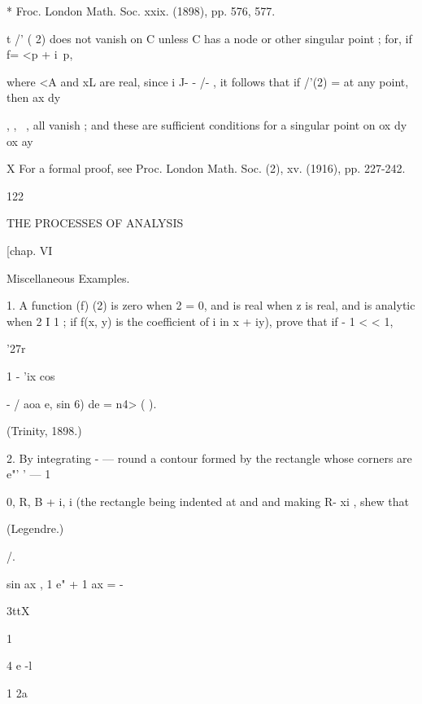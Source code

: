 {* Froc. London Math. Soc. xxix. (1898), pp. 576, 577.

t /' ( 2) does not vanish on C unless C has a node or other singular
point ; for, if f= <p + i\ p,

where <A and xL are real, since i J- - /- , it follows that if /'(2) =
at any point, then ax dy

  , , ~, all vanish ; and these are sufficient conditions for a
singular point on ox dy ox ay

X For a formal proof, see Proc. London Math. Soc. (2), xv. (1916), pp.
227-242.



122



THE PROCESSES OF ANALYSIS



[chap. VI



Miscellaneous Examples.

1. A function (f) (2) is zero when 2 = 0, and is real when z is real,
and is analytic when 2 I 1 ; if f(x, y) is the coefficient of i in x +
iy), prove that if - 1 < < 1,



'27r



1 - 'ix cos



  - / aoa e, sin 6) de = n4> ( ).



(Trinity, 1898.)



2. By integrating - — round a contour formed by the rectangle whose
corners are e"' ' — 1



0, R, B + i, i (the rectangle being indented at and and making R- xi ,
shew that

(Legendre.)



/.



sin ax , 1 e" + 1 ax = -



3ttX



1



4 e -l



1 2a



}
